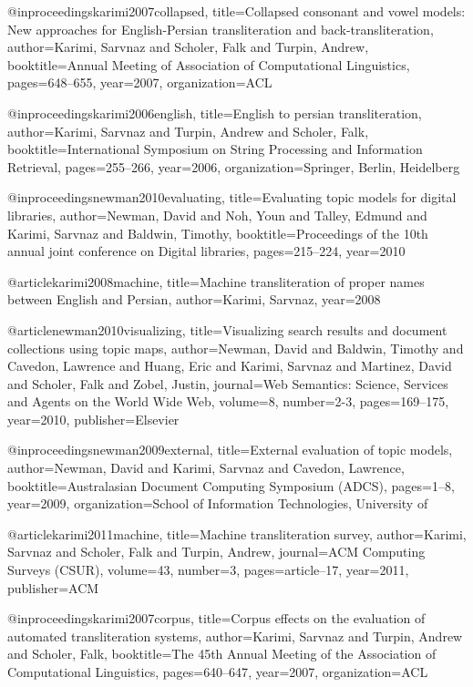 @inproceedings{karimi2007collapsed,
  title={Collapsed consonant and vowel models: New approaches for English-Persian transliteration and back-transliteration},
  author={Karimi, Sarvnaz and Scholer, Falk and Turpin, Andrew},
  booktitle={Annual Meeting of Association of Computational Linguistics},
  pages={648--655},
  year={2007},
  organization={ACL}
}

@inproceedings{karimi2006english,
  title={English to persian transliteration},
  author={Karimi, Sarvnaz and Turpin, Andrew and Scholer, Falk},
  booktitle={International Symposium on String Processing and Information Retrieval},
  pages={255--266},
  year={2006},
  organization={Springer, Berlin, Heidelberg}
}

@inproceedings{newman2010evaluating,
  title={Evaluating topic models for digital libraries},
  author={Newman, David and Noh, Youn and Talley, Edmund and Karimi, Sarvnaz and Baldwin, Timothy},
  booktitle={Proceedings of the 10th annual joint conference on Digital libraries},
  pages={215--224},
  year={2010}
}

@article{karimi2008machine,
  title={Machine transliteration of proper names between English and Persian},
  author={Karimi, Sarvnaz},
  year={2008}
}

@article{newman2010visualizing,
  title={Visualizing search results and document collections using topic maps},
  author={Newman, David and Baldwin, Timothy and Cavedon, Lawrence and Huang, Eric and Karimi, Sarvnaz and Martinez, David and Scholer, Falk and Zobel, Justin},
  journal={Web Semantics: Science, Services and Agents on the World Wide Web},
  volume={8},
  number={2-3},
  pages={169--175},
  year={2010},
  publisher={Elsevier}
}

@inproceedings{newman2009external,
  title={External evaluation of topic models},
  author={Newman, David and Karimi, Sarvnaz and Cavedon, Lawrence},
  booktitle={Australasian Document Computing Symposium (ADCS)},
  pages={1--8},
  year={2009},
  organization={School of Information Technologies, University of}
}

@article{karimi2011machine,
  title={Machine transliteration survey},
  author={Karimi, Sarvnaz and Scholer, Falk and Turpin, Andrew},
  journal={ACM Computing Surveys (CSUR)},
  volume={43},
  number={3},
  pages={article--17},
  year={2011},
  publisher={ACM}
}

@inproceedings{karimi2007corpus,
  title={Corpus effects on the evaluation of automated transliteration systems},
  author={Karimi, Sarvnaz and Turpin, Andrew and Scholer, Falk},
  booktitle={The 45th Annual Meeting of the Association of Computational Linguistics},
  pages={640--647},
  year={2007},
  organization={ACL}
}

